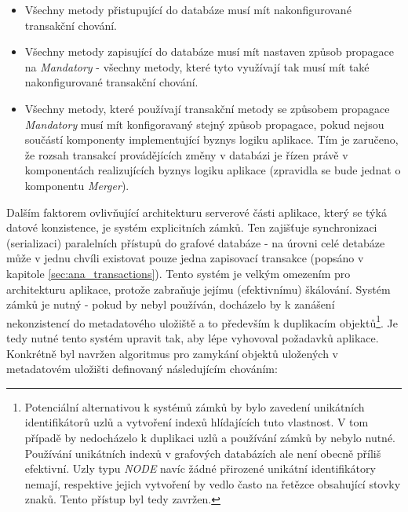 \begin{itemize}
   \item Všechny metody přistupující do databáze musí mít nakonfigurované transakční chování.
   \item Všechny metody zapisující do databáze musí mít nastaven způsob propagace na \textit{Mandatory} - všechny metody,
   které tyto využívají tak musí mít také nakonfigurované transakční chování.
   \item Všechny metody, které používají transakční metody se způsobem propagace \textit{Mandatory} musí mít konfigoravaný
   stejný způsob propagace, pokud nejsou součástí komponenty implementující byznys logiku aplikace. Tím je zaručeno, že rozsah
   transakcí provádějících změny v databázi je řízen právě v komponentách realizujících byznys logiku aplikace (zpravidla se bude jednat o komponentu \textit{Merger}).
\end{itemize}


Dalším faktorem ovlivňující architekturu serverové části aplikace, který se týká datové konzistence, je systém explicitních zámků. Ten zajišťuje synchronizaci (serializaci) paralelních přístupů do grafové databáze - na úrovni celé detabáze může v jednu chvíli existovat pouze jedna zapisovací transakce (popsáno v kapitole \ref{sec:ana_transactions}). Tento systém je velkým omezením pro architekturu aplikace, protože zabraňuje jejímu (efektivnímu) škálování. Systém zámků je nutný - pokud by nebyl používán, docházelo by k zanášení nekonzistencí do metadatového uložiště a to především k duplikacím objektů\footnote{Potenciální alternativou k systémů zámků by bylo zavedení unikátních identifikátorů uzlů a vytvoření indexů hlídajících tuto vlastnost. V tom případě by nedocházelo k duplikaci uzlů a používání zámků by nebylo nutné. Používání unikátních indexů v grafových databázích ale není obecně příliš efektivní. Uzly typu \textit{NODE} navíc žádné přirozené unikátní identifikátory nemají, respektive jejich vytvoření by vedlo často na řetězce obsahující stovky znaků. Tento přístup byl tedy zavržen.}. Je tedy nutné tento systém upravit tak, aby lépe vyhovoval požadavků aplikace. Konkrétně byl navržen algoritmus pro zamykání objektů uložených v metadatovém uložišti definovaný následujícím chováním:

